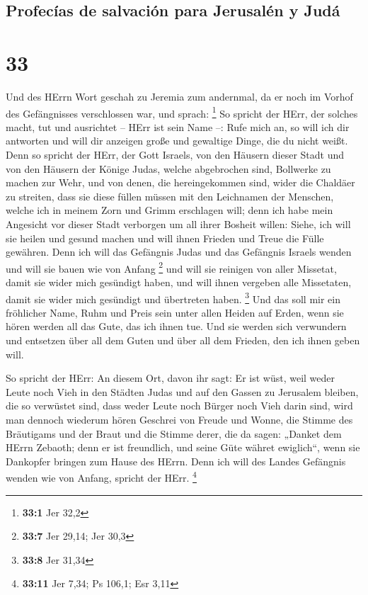 \hypertarget{profecuxedas-de-salvaciuxf3n-para-jerusaluxe9n-y-juduxe1}{%
\subsection{Profecías de salvación para Jerusalén y
Judá}\label{profecuxedas-de-salvaciuxf3n-para-jerusaluxe9n-y-juduxe1}}

\hypertarget{section-32}{%
\section{33}\label{section-32}}

 Und des HErrn Wort geschah zu Jeremia zum andernmal, da
er noch im Vorhof des Gefängnisses verschlossen war, und sprach:
\footnote{\textbf{33:1} Jer 32,2}  So spricht der HErr,
der solches macht, tut und ausrichtet -- HErr ist sein Name --:
 Rufe mich an, so will ich dir antworten und will dir
anzeigen große und gewaltige Dinge, die du nicht weißt. 
Denn so spricht der HErr, der Gott Israels, von den Häusern dieser Stadt
und von den Häusern der Könige Judas, welche abgebrochen sind, Bollwerke
zu machen zur Wehr,  und von denen, die hereingekommen
sind, wider die Chaldäer zu streiten, dass sie diese füllen müssen mit
den Leichnamen der Menschen, welche ich in meinem Zorn und Grimm
erschlagen will; denn ich habe mein Angesicht vor dieser Stadt verborgen
um all ihrer Bosheit willen:  Siehe, ich will sie heilen
und gesund machen und will ihnen Frieden und Treue die Fülle gewähren.
 Denn ich will das Gefängnis Judas und das Gefängnis
Israels wenden und will sie bauen wie von Anfang \footnote{\textbf{33:7}
  Jer 29,14; Jer 30,3}  und will sie reinigen von aller
Missetat, damit sie wider mich gesündigt haben, und will ihnen vergeben
alle Missetaten, damit sie wider mich gesündigt und übertreten haben.
\footnote{\textbf{33:8} Jer 31,34}  Und das soll mir ein
fröhlicher Name, Ruhm und Preis sein unter allen Heiden auf Erden, wenn
sie hören werden all das Gute, das ich ihnen tue. Und sie werden sich
verwundern und entsetzen über all dem Guten und über all dem Frieden,
den ich ihnen geben will.

 So spricht der HErr: An diesem Ort, davon ihr sagt: Er
ist wüst, weil weder Leute noch Vieh in den Städten Judas und auf den
Gassen zu Jerusalem bleiben, die so verwüstet sind, dass weder Leute
noch Bürger noch Vieh darin sind,  wird man dennoch
wiederum hören Geschrei von Freude und Wonne, die Stimme des Bräutigams
und der Braut und die Stimme derer, die da sagen: „Danket dem HErrn
Zebaoth; denn er ist freundlich, und seine Güte währet ewiglich``, wenn
sie Dankopfer bringen zum Hause des HErrn. Denn ich will des Landes
Gefängnis wenden wie von Anfang, spricht der HErr. \footnote{\textbf{33:11}
  Jer 7,34; Ps 106,1; Esr 3,11}

